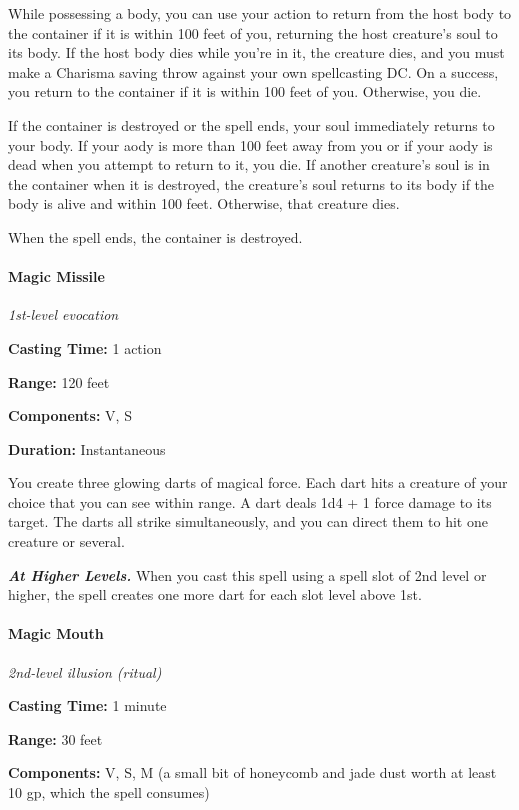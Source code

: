 \documentclass[
]{article}
\begin{document}
While possessing a body, you can use your action to return from the host
body to the container if it is within 100 feet of you, returning the
host creature's soul to its body. If the host body dies while you're in
it, the creature dies, and you must make a Charisma saving throw against
your own spellcasting DC. On a success, you return to the container if
it is within 100 feet of you. Otherwise, you die.

If the container is destroyed or the spell ends, your soul immediately
returns to your body. If your aody is more than 100 feet away from you
or if your aody is dead when you attempt to return to it, you die. If
another creature's soul is in the container when it is destroyed, the
creature's soul returns to its body if the body is alive and within 100
feet. Otherwise, that creature dies.

When the spell ends, the container is destroyed.

\hypertarget{magic-missile}{%
\paragraph{Magic Missile}\label{magic-missile}}

\emph{1st-level evocation}

\textbf{Casting Time:} 1 action

\textbf{Range:} 120 feet

\textbf{Components:} V, S

\textbf{Duration:} Instantaneous

You create three glowing darts of magical force. Each dart hits a
creature of your choice that you can see within range. A dart deals 1d4
+ 1 force damage to its target. The darts all strike simultaneously, and
you can direct them to hit one creature or several.

\emph{\textbf{At Higher Levels.}} When you cast this spell using a spell
slot of 2nd level or higher, the spell creates one more dart for each
slot level above 1st.

\hypertarget{magic-mouth}{%
\paragraph{Magic Mouth}\label{magic-mouth}}

\emph{2nd-level illusion (ritual)}

\textbf{Casting Time:} 1 minute

\textbf{Range:} 30 feet

\textbf{Components:} V, S, M (a small bit of honeycomb and jade dust
worth at least 10 gp, which the spell consumes)
\end{document}
